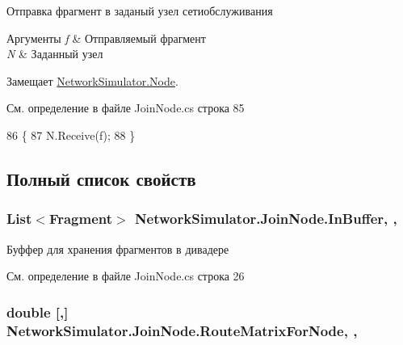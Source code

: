 Отправка фрагмент в заданый узел сетиобслуживания 


\begin{DoxyParams}{Аргументы}
{\em f} & Отправляемый фрагмент\\
\hline
{\em N} & Заданный узел\\
\hline
\end{DoxyParams}


Замещает \hyperlink{class_network_simulator_1_1_node_abcda5067b8842a447b2ad293818fc319}{Network\+Simulator.\+Node}.



См. определение в файле Join\+Node.\+cs строка 85


\begin{DoxyCode}
86         \{
87             N.Receive(f);
88         \}
\end{DoxyCode}


\subsection{Полный список свойств}
\subsubsection[{\texorpdfstring{In\+Buffer}{InBuffer}}]{\setlength{\rightskip}{0pt plus 5cm}List$<${\bf Fragment}$>$ Network\+Simulator.\+Join\+Node.\+In\+Buffer\hspace{0.3cm}{\ttfamily [get]}, {\ttfamily [set]}, {\ttfamily [protected]}}\hypertarget{class_network_simulator_1_1_join_node_ab581f4d5c3b4eb39d7e8820700b4d519}{}\label{class_network_simulator_1_1_join_node_ab581f4d5c3b4eb39d7e8820700b4d519}


Буффер для хранения фрагментов в дивадере 



См. определение в файле Join\+Node.\+cs строка 26

\subsubsection[{\texorpdfstring{Route\+Matrix\+For\+Node}{RouteMatrixForNode}}]{\setlength{\rightskip}{0pt plus 5cm}double \mbox{[},\mbox{]} Network\+Simulator.\+Join\+Node.\+Route\+Matrix\+For\+Node\hspace{0.3cm}{\ttfamily [get]}, {\ttfamily [set]}, {\ttfamily [protected]}}\hypertarget{class_network_simulator_1_1_join_node_a7db66d213f0ee75aef3d52bd0d6e5be2}{}\label{class_network_simulator_1_1_join_node_a7db66d213f0ee75aef3d52bd0d6e5be2}


